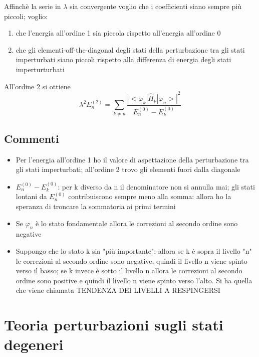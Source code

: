 \noindent Affinchè la serie in \(\lambda\) sia convergente voglio che i coefficienti siano sempre più piccoli; voglio:
\begin{enumerate}
    \item che l'energia all'ordine 1 sia piccola rispetto all'energia all'ordine 0
    \item che gli elementi-off-the-diagonal degli stati  della perturbazione tra gli stati imperturbati siano piccoli rispetto alla differenza di energia degli stati imperturturbati
\end{enumerate}

\noindent All'ordine 2 si ottiene 
\begin{equation*}
    \lambda^2 E^{(2)}_n = \sum_{k \neq n} \frac{{|<\varphi_k | \hat{H}_p | \varphi_n >|}^2}{E^{(0)}_n - E^{(0)}_k}
\end{equation*}

\subsection*{Commenti}

\begin{itemize}
    \item Per l'energia all'ordine 1 ho il valore di aspettazione della perturbazione tra gli stati imperturbati; all'ordine 2 trovo gli elementi fuori dalla diagonale
    \item \(E^{(0)}_n - E^{(0)}_k\): per k diverso da n il denominatore non si annulla mai; gli stati lontani da \(E^{(0)}_n\) contribuiscono sempre meno alla somma: allora ho la speranza di troncare la sommatoria ai primi termini
    \item Se \(\varphi_n\) è lo stato fondamentale allora le correzioni al secondo ordine sono negative 
    \item Suppongo che lo stato k sia "più importante": allora se k è sopra il livello "n" le correzioni al secondo ordine sono negative, quindi il livello n viene spinto verso il basso; se k invece è sotto il livello n allora le correzioni al secondo ordine sono positive e quindi il livello n viene spinto verso l'alto. Si ha quella che viene chiamata TENDENZA DEI LIVELLI A RESPINGERSI
\end{itemize}

\section{Teoria perturbazioni sugli stati degeneri}

